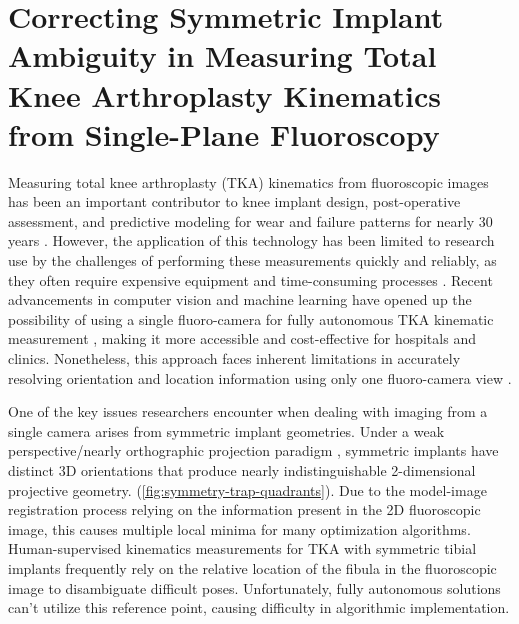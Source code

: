 \chapter{Correcting Symmetric Implant Ambiguity in Measuring Total Knee Arthroplasty Kinematics from Single-Plane Fluoroscopy}

Measuring total knee arthroplasty (TKA) kinematics from fluoroscopic images has been an important contributor to knee implant design, post-operative assessment, and predictive modeling for wear and failure patterns for nearly 30 years \cite{banksRationaleResultsFixedBearing2019,banks2003HapPaul2004,freglyComputationalWearPrediction2005}.
However, the application of this technology has been limited to research use by the challenges of performing these measurements quickly and reliably, as they often require expensive equipment and time-consuming processes \cite{banksAccurateMeasurementThreedimensional1996,lafortuneThreedimensionalKinematicsHuman1992,zuffiModelbasedMethodReconstruction1999,mahfouzRobustMethodRegistration2003}.
Recent advancements in computer vision and machine learning have opened up the possibility of using a single fluoro-camera for fully autonomous TKA kinematic measurement \cite{brobergValidationMachineLearning2023,jensenJointTrackMachine2023}, making it more accessible and cost-effective for hospitals and clinics.
Nonetheless, this approach faces inherent limitations in accurately resolving orientation and location information using only one fluoro-camera view \cite{banksAccurateMeasurementThreedimensional1996,floodAutomatedRegistration3D2018,mahfouzRobustMethodRegistration2003,yamazakiImprovementDepthPosition2004,zuffiModelbasedMethodReconstruction1999}.

One of the key issues researchers encounter when dealing with imaging from a single camera arises from symmetric implant geometries.
Under a weak perspective/nearly orthographic projection paradigm \cite{szeliskiComputerVisionAlgorithms2022}, symmetric implants have distinct 3D orientations that produce nearly indistinguishable 2-dimensional projective geometry.  (\cref{fig:symmetry-trap-quadrants}).
Due to the model-image registration process relying on the information present in the 2D fluoroscopic image, this causes multiple local minima for many optimization algorithms.
Human-supervised kinematics measurements for TKA with symmetric tibial implants frequently rely on the relative location of the fibula in the fluoroscopic image to disambiguate difficult poses.
Unfortunately, fully autonomous solutions can’t utilize this reference point, causing difficulty in algorithmic implementation.

